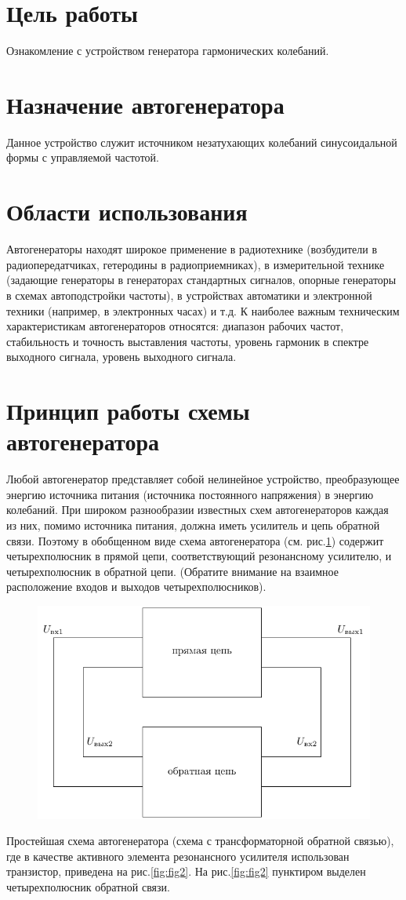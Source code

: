 



\newpage


\section{Цель работы}
Ознакомление с устройством генератора гармонических колебаний.

\section{Назначение автогенератора}
Данное устройство служит источником незатухающих колебаний синусоидальной формы с управляемой частотой.

\section{Области использования}
Автогенераторы находят широкое применение в радиотехнике (возбудители в радиопередатчиках, гетеродины в радиоприемниках), в измерительной технике (задающие генераторы в генераторах стандартных сигналов, опорные генераторы в схемах автоподстройки частоты), в устройствах автоматики и электронной техники (например, в электронных часах) и т.д.
К наиболее важным техническим характеристикам автогенераторов относятся: диапазон рабочих частот, стабильность и точность выставления частоты, уровень гармоник в спектре выходного сигнала, уровень выходного сигнала.

\section{Принцип работы схемы автогенератора}
Любой автогенератор представляет собой нелинейное устройство, преобразующее энергию источника питания (источника постоянного напряжения) в энергию колебаний. При широком разнообразии известных схем автогенераторов каждая из них, помимо источника питания, должна иметь усилитель и цепь обратной связи. Поэтому в обобщенном виде схема автогенератора (см. рис.\ref{fig:fig1}) содержит четырехполюсник в прямой цепи, соответствующий резонансному усилителю, и четырехполюсник в обратной цепи. (Обратите внимание на взаимное расположение входов и выходов четырехполюсников).
\begin{figure}[h]
	\centering
	\includegraphics[width=0.5\linewidth]{circuit/one.pdf}
	\caption{}
	\label{fig:fig1}
\end{figure}
Простейшая схема автогенератора (схема с трансформаторной обратной связью), где в качестве активного элемента резонансного усилителя использован транзистор, приведена на рис.\ref{fig:fig2}. На рис.\ref{fig:fig2} пунктиром выделен четырехполюсник обратной связи.


